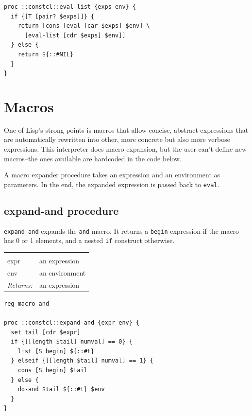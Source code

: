 \documentclass[a5paper,draft]{memoir}
\begin{document}
\begin{lstlisting}
proc ::constcl::eval-list {exps env} {
  if {[T [pair? $exps]]} {
    return [cons [eval [car $exps] $env] \
      [eval-list [cdr $exps] $env]]
  } else {
    return ${::#NIL}
  }
}
\end{lstlisting}

\section{Macros}
\label{macros}

One of Lisp's strong points is macros that allow concise, abstract expressions that are automatically rewritten into other, more concrete but also more verbose expressions. This interpreter does macro expansion, but the user can't define new macros--the ones available are hardcoded in the code below.

A macro expander procedure takes an expression and an environment as parameters. In the end, the expanded expression is passed back to \texttt{eval}.

\subsection{expand-and procedure}
\label{expandand-procedure}

\texttt{expand-and} expands the \texttt{and} macro. It returns a \texttt{begin}-expression if the macro has 0 or 1 elements, and a nested \texttt{if} construct otherwise.

\noindent\begin{tabular}{ |p{1.9cm} p{6.5cm}| }
\hline
\rowcolor[HTML]{CCCCCC} \multicolumn{2}{|l|}{\textbf{expand-and (internal)}} \\
expr & an expression \\
env & an environment \\
\textit{Returns:} & an expression \\
\hline
\end{tabular}

\begin{lstlisting}
reg macro and

proc ::constcl::expand-and {expr env} {
  set tail [cdr $expr]
  if {[[length $tail] numval] == 0} {
    list [S begin] ${::#t}
  } elseif {[[length $tail] numval] == 1} {
    cons [S begin] $tail
  } else {
    do-and $tail ${::#t} $env
  }
}
\end{lstlisting}
\end{document}
